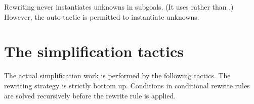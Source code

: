 \begin{warn}
Rewriting never instantiates unknowns in subgoals.  (It uses
 rather than .)  However, the
auto-tactic is permitted to instantiate unknowns.
\end{warn}


\section{The simplification tactics} \label{simp-tactics}
The actual simplification work is performed by the following tactics.  The
rewriting strategy is strictly bottom up.  Conditions in conditional rewrite
rules are solved recursively before the rewrite rule is applied.

